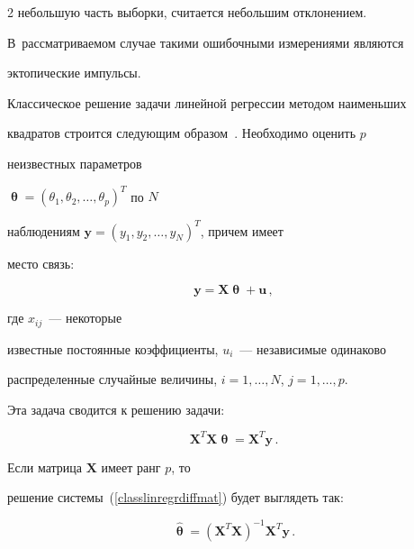 \begin{multicols}{2}
небольшую часть выборки, считается небольшим отклонением. 


В~рассматриваемом случае такими ошибочными измерениями являются


эктопические импульсы.





Классическое решение задачи линейной регрессии методом наименьших


квадратов строится следующим образом~\cite{5ma}. Необходимо оценить $p$


неизвестных параметров


$\bm{\uptheta}=(\theta_1,\theta_2,\ldots,\theta_p)^T$ по $N$


наблюдениям $\mathbf{y}=(y_1,y_2,\ldots,y_N)^T$, причем имеет


место связь:


\begin{equation*}




\mathbf{y = X\bm{\uptheta}+u}\,,


\end{equation*}


где $x_{ij}$~--- некоторые


известные постоянные коэффициенты, $u_i$~--- независимые одинаково


распределенные случайные величины, $i=1,\ldots,N$, $j=1,\ldots,p$.





Эта задача сводится к решению задачи:


\begin{equation}


\label{classlinregrdiffmat}


\mathbf{X}^T\mathbf{X}\bm{\uptheta}=\mathbf{X}^T\mathbf{y}\,.


\end{equation}


Если матрица $\mathbf{X}$ имеет ранг $p$, то


решение системы~(\ref{classlinregrdiffmat}) будет выглядеть так:


\begin{equation*}




\hat{\bm{\uptheta}} =


(\mathbf{X}^T\mathbf{X})^{-1}\mathbf{X}^T\mathbf{y}\,.


\end{equation*}






\end{multicols}
